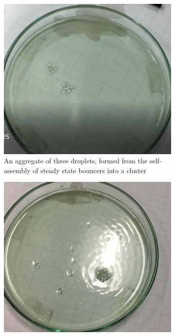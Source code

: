\begin{figure}[ht]
    \begin{subfigure}[t]{0.5\textwidth}
        \centering
        \includegraphics[width=\textwidth]{prototype/exp_rep_imgs/triangular_lattice.jpg}
        \caption{An aggregate of three droplets, formed from the self-assembly of steady state bouncers into a cluster}
        \label{fig:triangle_structure}
    \end{subfigure}
    \begin{subfigure}[t]{0.5\textwidth}
        \centering
        \includegraphics[width=\textwidth]{prototype/exp_rep_imgs/lattice_cluster.jpg}

\end{subfigure}
\end{figure}
